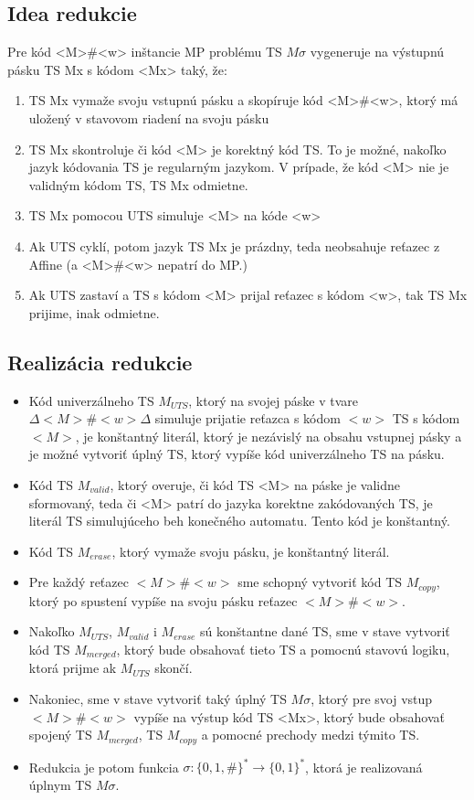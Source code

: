 \documentclass[10pt]{article}
\begin{document}
\subsection*{Idea redukcie}
Pre kód <M>\#<w> inštancie MP problému TS $M\sigma$ vygeneruje na výstupnú pásku TS Mx s kódom <Mx> taký, že:
\begin{enumerate}
    \item TS Mx vymaže svoju vstupnú pásku a skopíruje kód <M>\#<w>, ktorý má uložený v stavovom
        riadení na svoju pásku
    \item TS Mx skontroluje či kód <M> je korektný kód TS. To je možné, nakoľko jazyk kódovania TS
        je regularným jazykom. V prípade, že kód <M> nie je validným kódom TS, TS Mx odmietne. 
    \item TS Mx pomocou UTS simuluje <M> na kóde <w>
    \item Ak UTS cyklí, potom jazyk TS Mx je prázdny, teda neobsahuje reťazec z Affine (a
        <M>\#<w> nepatrí do MP.)
    \item Ak UTS zastaví a TS s kódom <M> prijal reťazec s kódom <w>, tak TS Mx prijime, inak odmietne.
\end{enumerate}

\subsection*{Realizácia redukcie}
\begin{itemize}
    \item Kód univerzálneho TS $M_{UTS}$, ktorý na svojej páske v tvare $\Delta <M>\#<w> \Delta$ simuluje
        prijatie reťazca s kódom $<w>$ TS s kódom $<M>$, je konštantný literál, ktorý je nezávislý
        na obsahu vstupnej pásky a je možné vytvoriť úplný TS, ktorý vypíše kód univerzálneho TS na pásku. 
    \item Kód TS $M_{valid}$, ktorý overuje, či kód TS <M> na páske je validne sformovaný, teda či <M> patrí do jazyka
        korektne zakódovaných TS, je literál TS simulujúceho beh konečného automatu. Tento kód je
        konštantný.
    \item Kód TS $M_{erase}$, ktorý vymaže svoju pásku, je konštantný literál. 
    \item Pre každý reťazec $<M>\#<w>$ sme schopný vytvoriť kód TS $M_{copy}$, ktorý po spustení vypíše na svoju
        pásku reťazec $<M>\#<w>$. 
    \item Nakoľko $M_{UTS}$, $M_{valid}$ i $M_{erase}$ sú konštantne dané TS, sme v stave vytvoriť
        kód TS $M_{merged}$, ktorý bude obsahovať tieto TS a pomocnú stavovú logiku, ktorá prijme ak $M_{UTS}$
        skončí.
    \item Nakoniec, sme v stave vytvoriť taký úplný TS $M\sigma$, ktorý pre svoj vstup $<M>\#<w>$ vypíše na
        výstup kód TS <Mx>, ktorý bude obsahovať spojený TS $M_{merged}$, TS $M_{copy}$ a pomocné
        prechody medzi týmito TS.
    
    \item Redukcia je potom funkcia $\sigma: \{0,1,\#\}^* \to \{0,1\}^*$, ktorá je realizovaná úplnym
    TS $M\sigma$.
\end{itemize}
\end{document}
